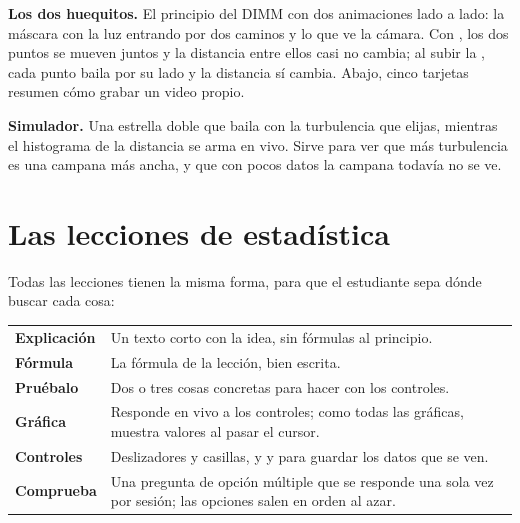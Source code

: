 
\textbf{Los dos huequitos.} El principio del DIMM con dos animaciones lado a lado: la máscara con la luz entrando por
dos caminos y lo que ve la cámara. Con , los dos puntos se mueven juntos y la
distancia entre ellos casi no cambia; al subir la , cada punto baila por su lado y la distancia sí
cambia. Abajo, cinco tarjetas resumen cómo grabar un video propio.


\textbf{Simulador.} Una estrella doble que baila con la turbulencia que elijas, mientras el histograma de la distancia se
arma en vivo. Sirve para ver que más turbulencia es una campana más ancha, y que con pocos datos la campana todavía no se
ve.

\section{Las lecciones de estadística}

Todas las lecciones tienen la misma forma, para que el estudiante sepa dónde buscar cada cosa:

\begin{center}\small
\begin{tabularx}{\linewidth}{@{}>{\bfseries\color{acentoosc}}l Y@{}}
Explicación & Un texto corto con la idea, sin fórmulas al principio.\\
Fórmula & La fórmula de la lección, bien escrita.\\
Pruébalo & Dos o tres cosas concretas para hacer con los controles.\\
Gráfica & Responde en vivo a los controles; como todas las gráficas, muestra valores al pasar el cursor.\\
Controles & Deslizadores y casillas, y  y  para guardar los datos que se ven.\\
Comprueba & Una pregunta de opción múltiple que se responde una sola vez por sesión; las opciones salen en orden al azar.\\
\end{tabularx}
\end{center}


